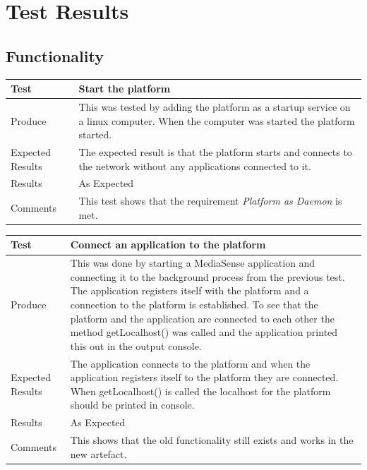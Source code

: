 \section{Test Results}
\subsection{Functionality}

\begin{center}
    \begin{tabular}{ | l | p{12cm} |}
    \hline
    Test 	 				& 		 Start the platform\\ \hline
	Produce  				& 		 This was tested by adding the platform as a startup service on a linux computer. When the computer was started the platform started.\\ \hline
	Expected Results  		& 		 The expected result is that the platform starts and connects to the network without any applications connected to it. \\ \hline
	Results 				& 		 As Expected\\ \hline
	Comments				& 		 This test shows that the requirement \emph{Platform as Daemon} is met.\\ \hline
    \end{tabular}
\end{center}

\begin{center}
    \begin{tabular}{ | l | p{12cm} |}
    \hline
    Test 	 				& 		 Connect an application to the platform \\ \hline
	Produce  				& 		 This was done by starting a MediaSense application and connecting it to the background process from the previous test. The application registers itself with the platform and a connection to the platform is established. To see that the platform and the application are connected to each other the method getLocalhost() was called and the application printed this out in the output console. \\ \hline
	Expected Results  		& 		 The application connects to the platform and when the application registers itself to the platform they are connected. When getLocalhost() is called the localhost for the platform should be printed in console. \\ \hline
	Results 				& 		 As Expected\\ \hline
	Comments				& 		 This shows that the old functionality still exists and works in the new artefact.\\ \hline
    \end{tabular}
\end{center}

